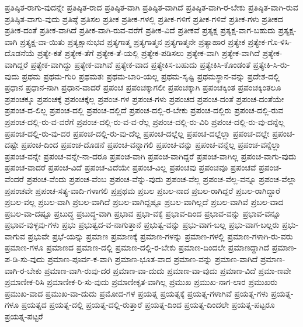 {ಪ್ರತಿಷ್ಠಿತ-ರಾಗು-ವುದನ್ನೇ
ಪ್ರತಿಷ್ಠಿತ-ರಾದ
ಪ್ರತಿಷ್ಠಿತ-ವಾಗಿ
ಪ್ರತಿಷ್ಠಿತ-ವಾಗಿದೆ
ಪ್ರತಿಷ್ಠಿತ-ವಾಗಿ-ರ-ಬೇಕು
ಪ್ರತಿಷ್ಠಿತ-ವಾಗಿ-ರುವ
ಪ್ರತಿಷ್ಠಿತ-ವಾಗು-ವುದು
ಪ್ರತಿಷ್ಠೆ
ಪ್ರತಿಸಲ
ಪ್ರತೀಕ
ಪ್ರತೀಕ-ಗಳಲ್ಲಿ
ಪ್ರತೀಕ-ಗಳಿಗೆ
ಪ್ರತೀಕ-ಗಳಿವೆ
ಪ್ರತೀಕ-ಗಳು
ಪ್ರತೀಕದ
ಪ್ರತೀಕ-ದಂತೆ
ಪ್ರತೀಕ-ವಾಗಿದೆ
ಪ್ರತೀಕ-ವಾಗಿ-ರುವ-ವರೆಗೆ
ಪ್ರತೀಕ-ವಿದೆ
ಪ್ರತೀಕವೆ
ಪ್ರತ್ಯಕ್ಷ
ಪ್ರತ್ಯಕ್ಷ-ವಾಗ-ಬಹುದು
ಪ್ರತ್ಯಕ್ಷ-ವಾಗಿ
ಪ್ರತ್ಯಕ್ಷ-ವಾ-ಯಿತು
ಪ್ರತ್ಯಕ್ಷಾನುಭವ
ಪ್ರತ್ಯಗಾತ್ಮ
ಪ್ರತ್ಯಗಾತ್ಮನ
ಪ್ರತ್ಯಗಾತ್ಮನೇ
ಪ್ರತ್ಯಾಹಾರ
ಪ್ರತ್ಯೇಕ
ಪ್ರತ್ಯೇಕ-ಗೊ-ಳಿಸಿ-ದೊಡನೆಯೆ
ಪ್ರತ್ಯೇ-ಕತೆ
ಪ್ರತ್ಯೇಕ-ತೆಗೆ
ಪ್ರತ್ಯೇಕ-ತೆ-ಯಲ್ಲಿ
ಪ್ರತ್ಯೇಕ-ಪಡಿಸಲು
ಪ್ರತ್ಯೇಕ-ವಾಗಿ
ಪ್ರತ್ಯೇಕ-ವಾಗಿದೆ
ಪ್ರತ್ಯೇಕ-ವಾಗಿದ್ದರೆ
ಪ್ರತ್ಯೇಕ-ವಾಗಿದ್ದು
ಪ್ರತ್ಯೇಕ-ವಾಗಿವೆ
ಪ್ರತ್ಯೇಕ-ವಾದ
ಪ್ರತ್ಯೇಕಿಸ-ಬಹುದು
ಪ್ರತ್ಯೇಕಿಸಿ-ಕೊಂಡಂತೆ
ಪ್ರತ್ಯೇಕಿ-ಸಿ-ರು-ವುದು
ಪ್ರಥಮ
ಪ್ರಥಮ-ಗುರಿ
ಪ್ರಥಮತಃ
ಪ್ರಥಮ-ಬಾರಿ-ಯಲ್ಲ
ಪ್ರಥಮ-ಸೃಷ್ಟಿ
ಪ್ರಥಮಸ್ಥಾನ-ವನ್ನು
ಪ್ರದೇಶ-ದಲ್ಲಿ
ಪ್ರಧಾನ
ಪ್ರಧಾನ-ನಾಗಿ
ಪ್ರಧಾನ-ವಾದರೆ
ಪ್ರಪಂಚ
ಪ್ರಪಂಚಕ್ಕಾಗಲೀ
ಪ್ರಪಂಚಕ್ಕಾಗಿ
ಪ್ರಪಂಚಕ್ಕಿಂತ
ಪ್ರಪಂಚಕ್ಕಿಂತಲೂ
ಪ್ರಪಂಚಕ್ಕೂ
ಪ್ರಪಂಚಕ್ಕೆ
ಪ್ರಪಂಚಕ್ಕೆಲ್ಲ
ಪ್ರಪಂಚ-ಗಳ
ಪ್ರಪಂಚ-ಗಳು
ಪ್ರಪಂಚದ
ಪ್ರಪಂಚ-ದಂತೆ
ಪ್ರಪಂಚ-ದಂತೆಯೇ
ಪ್ರಪಂಚ-ದ-ಲಿಲ್ಲ
ಪ್ರಪಂಚ-ದಲ್ಲಿ
ಪ್ರಪಂಚ-ದಲ್ಲಿದೆ
ಪ್ರಪಂಚ-ದಲ್ಲಿ-ರ-ಬೇಕು
ಪ್ರಪಂಚ-ದಲ್ಲಿರು
ಪ್ರಪಂಚ-ದಲ್ಲಿ-ರುವ
ಪ್ರಪಂಚ-ದಲ್ಲಿ-ರು-ವ-ವರೆಗೆ
ಪ್ರಪಂಚ-ದಲ್ಲಿ-ರು-ವ-ವ-ರೆಲ್ಲ
ಪ್ರಪಂಚ-ದಲ್ಲಿ-ರು-ವಿರಿ
ಪ್ರಪಂಚ-ದಲ್ಲಿ-ರು-ವು-ದನ್ನೆಲ್ಲ
ಪ್ರಪಂಚ-ದಲ್ಲಿ-ರು-ವು-ದರ
ಪ್ರಪಂಚ-ದಲ್ಲಿ-ರು-ವು-ದೆಲ್ಲ
ಪ್ರಪಂಚ-ದಲ್ಲೆಲ್ಲ
ಪ್ರಪಂಚ-ದಲ್ಲೆಲ್ಲಾ
ಪ್ರಪಂಚ-ದಲ್ಲೇ
ಪ್ರಪಂಚ-ದಷ್ಟೇ
ಪ್ರಪಂಚ-ದಿಂದ
ಪ್ರಪಂಚ-ದೊಡನೆ
ಪ್ರಪಂಚ-ವನ್ನಾಗಲಿ
ಪ್ರಪಂಚ-ವನ್ನು
ಪ್ರಪಂಚ-ವನ್ನೆಲ್ಲ
ಪ್ರಪಂಚ-ವನ್ನೆಲ್ಲಾ
ಪ್ರಪಂಚ-ವನ್ನೇ
ಪ್ರಪಂಚ-ವನ್ನೇ-ನಾ-ದರೂ
ಪ್ರಪಂಚ-ವಾಗಿ
ಪ್ರಪಂಚ-ವಾಗಿದ್ದರೆ
ಪ್ರಪಂಚ-ವಾಗಿಲ್ಲ
ಪ್ರಪಂಚ-ವಾಗು-ವುದು
ಪ್ರಪಂಚ-ವಾದರೆ
ಪ್ರಪಂಚ-ವಿದೆ
ಪ್ರಪಂಚ-ವಿದೆಯೇ
ಪ್ರಪಂಚ-ವಿಲ್ಲ
ಪ್ರಪಂಚವು
ಪ್ರಪಂಚವೂ
ಪ್ರಪಂಚವೆ
ಪ್ರಪಂಚ-ವೆಂದರೆ
ಪ್ರಪಂಚ-ವೆಂದು
ಪ್ರಪಂಚ-ವೆಂಬ
ಪ್ರಪಂಚ-ವೆನ್ನು-ವುದು
ಪ್ರಪಂಚ-ವೆಲ್ಲ
ಪ್ರಪಂಚ-ವೆಲ್ಲ-ವನ್ನೂ
ಪ್ರಪಂಚ-ವೆಲ್ಲಾ
ಪ್ರಪಂಚವೇ
ಪ್ರಪಂಚ-ಸತ್ಯ-ವಾದಿ-ಗಳಾಗಲಿ
ಪ್ರಪ್ರಥಮ
ಪ್ರಬಲ
ಪ್ರಬಲ-ನಾದ
ಪ್ರಬಲ-ರಾಗಿದ್ದರೆ
ಪ್ರಬಲ-ರಾಗಿದ್ದಾರೆ
ಪ್ರಬಲ-ವಲ್ಲ
ಪ್ರಬಲ-ವಾಗಿ
ಪ್ರಬಲ-ವಾಗಿದೆ
ಪ್ರಬಲ-ವಾಗಿದ್ದಷ್ಟೂ
ಪ್ರಬಲ-ವಾಗಿಲ್ಲದೆ
ಪ್ರಬಲ-ವಾಗಿವೆ
ಪ್ರಬಲ-ವಾದ
ಪ್ರಬಲ-ವಾ-ದಷ್ಟೂ
ಪ್ರಬುದ್ಧ
ಪ್ರಬುದ್ಧ-ವಾಗಿ
ಪ್ರಭಾವ
ಪ್ರಭಾ-ವಕ್ಕೆ
ಪ್ರಭಾವ-ದಿಂದ
ಪ್ರಭಾವ-ವನ್ನು
ಪ್ರಭಾವ-ವನ್ನೂ
ಪ್ರಭಾವ-ವುಳ್ಳವು-ಗಳು
ಪ್ರಭು
ಪ್ರಭುತ್ವದ-ವ-ನಾಗುತ್ತಾನೆ
ಪ್ರಭುತ್ವ-ವನ್ನು
ಪ್ರಭು-ವಾಗ-ಬಲ್ಲ
ಪ್ರಭು-ವಾಗ-ಬಲ್ಲರು
ಪ್ರಭು-ವಾಗುವ
ಪ್ರಭುವೇ
ಪ್ರಭೆ-ಯನ್ನು
ಪ್ರಮಾಣ
ಪ್ರಮಾಣಕ್ಕೆ
ಪ್ರಮಾಣ-ಗಳನ್ನು
ಪ್ರಮಾಣ-ಗಳಲ್ಲಿ
ಪ್ರಮಾಣ-ಗಳಾಗಿ-ರು-ವರು
ಪ್ರಮಾಣ-ಗಳೂ
ಪ್ರಮಾಣದ
ಪ್ರಮಾಣ-ದಲ್ಲಿ
ಪ್ರಮಾಣ-ದಲ್ಲಿ-ರ-ಬೇಕು
ಪ್ರಮಾಣ-ದಿಂದಲೇ
ಪ್ರಮಾಣದ್ದಾಗಿದೆ
ಪ್ರಮಾಣ-ಪ-ಡಿ-ಸು-ವುದು
ಪ್ರಮಾಣ-ಪೂರ್ವ-ಕ-ವಾಗಿ
ಪ್ರಮಾಣ-ಭೂತ-ವಾದ
ಪ್ರಮಾಣ-ವನ್ನು
ಪ್ರಮಾಣ-ವಾಗಿದೆ
ಪ್ರಮಾಣ-ವಾಗಿ-ರ-ಬೇಕು
ಪ್ರಮಾಣ-ವಾಗಿ-ರುವು-ದರ
ಪ್ರಮಾಣ-ವಾ-ದುದು
ಪ್ರಮಾಣ-ವಾ-ವುದು
ಪ್ರಮಾಣ-ವಿದೆ
ಪ್ರಮಾ-ಣವೇ
ಪ್ರಮಾಣೀಕ-ರಿಸಿ
ಪ್ರಮಾಣೀಕ-ರಿ-ಸು-ವುದು
ಪ್ರಮಾಣೀಕೃತ-ವಾಗಿಲ್ಲ
ಪ್ರಮುಖ
ಪ್ರಮುಖ-ನಾಗ-ಲಾರ
ಪ್ರಮುಖರು
ಪ್ರಮುಖ-ವಾದ
ಪ್ರಮುಖ-ವಾ-ದುದು
ಪ್ರಮೋದ-ಗಳ
ಪ್ರಯತ್ನ
ಪ್ರಯತ್ನಕ್ಕೆ
ಪ್ರಯತ್ನ-ಗಳಾಗಿವೆ
ಪ್ರಯತ್ನ-ಗಳು
ಪ್ರಯತ್ನ-ಗಳೂ
ಪ್ರಯತ್ನದ
ಪ್ರಯತ್ನ-ದಲ್ಲಿ
ಪ್ರಯತ್ನ-ದಲ್ಲಿ-ರುತ್ತಾರೆ
ಪ್ರಯತ್ನ-ದಿಂದ
ಪ್ರಯತ್ನ-ದಿಂದಲೇ
ಪ್ರಯತ್ನ-ಪಟ್ಟರೂ
ಪ್ರಯತ್ನ-ಪಟ್ಟರೆ
}
